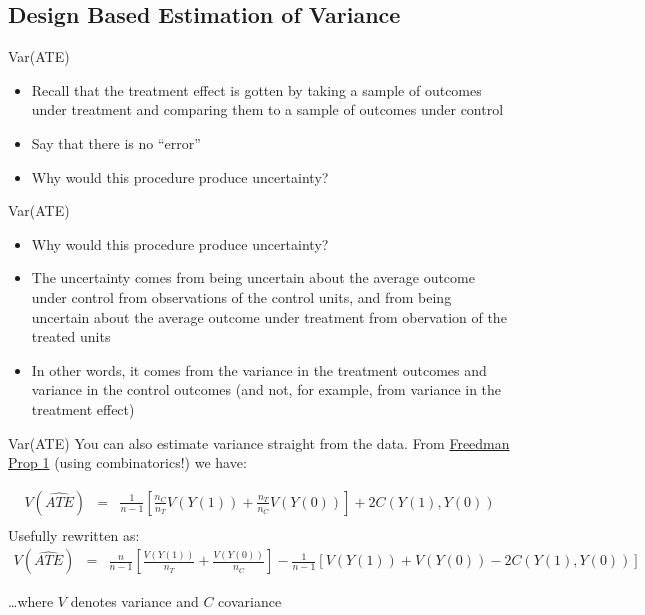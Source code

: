 \documentclass[
  11pt,
  ignorenonframetext,
]{beamer}
\providecommand{\tightlist}{%
  \setlength{\itemsep}{0pt}\setlength{\parskip}{0pt}}\usepackage{longtable,booktabs,array}
\begin{document}
\hypertarget{design-based-estimation-of-variance}{%
\subsection{Design Based Estimation of
Variance}\label{design-based-estimation-of-variance}}

\begin{frame}{Var(ATE)}
\protect\hypertarget{varate}{}
\begin{itemize}
\tightlist
\item
  Recall that the treatment effect is gotten by taking a sample of
  outcomes under treatment and comparing them to a sample of outcomes
  under control
\item
  Say that there is no ``error''
\item
  Why would this procedure produce uncertainty?
\end{itemize}
\end{frame}

\begin{frame}{Var(ATE)}
\protect\hypertarget{varate-1}{}
\begin{itemize}
\tightlist
\item
  Why would this procedure produce uncertainty?
\item
  The uncertainty comes from being uncertain about the average outcome
  under control from observations of the control units, and from being
  uncertain about the average outcome under treatment from obervation of
  the treated units
\item
  In other words, it comes from the variance in the treatment outcomes
  and variance in the control outcomes (and not, for example, from
  variance in the treatment effect)
\end{itemize}
\end{frame}

\begin{frame}{Var(ATE)}
\protect\hypertarget{varate-2}{}
\scriptsize You can also estimate variance straight from the data. From
\href{http://www.stat.berkeley.edu/~census/neyregcm.pdf}{Freedman Prop 1}
(using combinatorics!) we have:

\begin{eqnarray*} 
V(\widehat{ATE})  &=  &\frac{1}{n-1}\left[\frac{n_C}{n_T}V(Y(1)) +  \frac{n_T}{n_C}V(Y(0))\right] + 2C\left(Y(1),Y(0)\right)  \nonumber \\
\end{eqnarray*} Usefully rewritten as: \begin{eqnarray*} 
V(\widehat{ATE})  &=  &\frac{n}{n-1}\left[\frac{V(Y(1))}{n_T} +  \frac{V(Y(0))}{n_C}\right] - \frac{1}{n-1}\left[V(Y(1)) + V(Y(0)) - 2C\left(Y(1),Y(0)\right)\right]  \nonumber 
\end{eqnarray*}

\dots where \(V\) denotes variance and \(C\) covariance
\end{frame}
\end{document}
